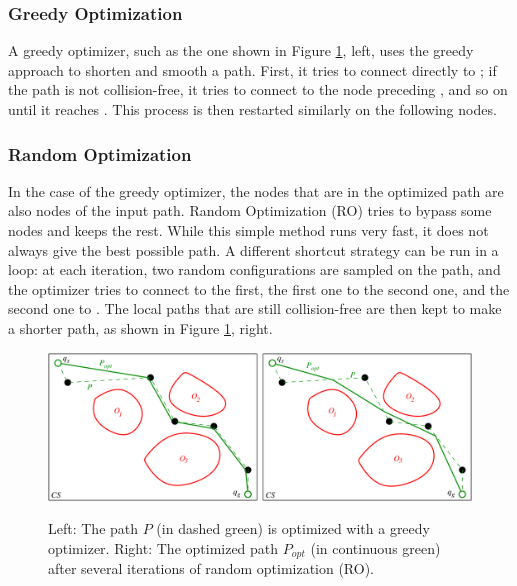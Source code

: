\subsubsection{Greedy Optimization}

A greedy optimizer, such as the one shown in Figure
\ref{fig:chap1-optimizers}, left, uses the greedy approach to shorten
and smooth a path. First, it tries to connect directly  to
; if the path is not collision-free, it tries to connect
 to the node preceding , and so on until it
reaches . This process is then restarted similarly on the
following nodes.

\subsubsection{Random Optimization}
\label{subsubsec:chap3-random-optimization}

In the case of the greedy optimizer, the nodes that are in the
optimized path are also nodes of the input path. Random Optimization
(RO) tries to bypass some nodes and keeps the rest. While this simple
method runs very fast, it does not always give the best possible
path. A different shortcut strategy can be run in a loop: at each
iteration, two random configurations are sampled on the path, and the
optimizer tries to connect  to the first, the first one to
the second one, and the second one to . The local paths that
are still collision-free are then kept to make a shorter path, as
shown in Figure \ref{fig:chap1-optimizers}, right.

\begin{figure}
  \centering
      {\includegraphics[width = \linewidth]
        {src/chap1-path-optimization/optimizers.pdf}}
      \caption{Left: The path $P$ (in dashed green) is optimized with
        a greedy optimizer. Right: The optimized path $P_{opt}$ (in
        continuous green) after several iterations of random
        optimization (RO).}
      \label{fig:chap1-optimizers}
\end{figure}

